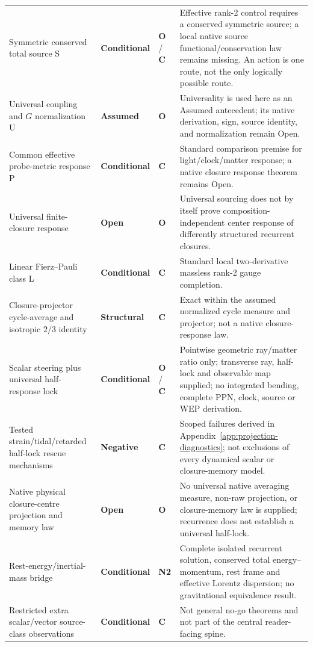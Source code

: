 \documentclass[11pt]{article}
\newcommand{\statusNegative}{\textcolor{red!65!black}{\textbf{Negative}}}
\newcommand{\statusStructural}{\textcolor{blue!55!black}{\textbf{Structural}}}
\newcommand{\statusConditional}{\textcolor{yellow!60!black}{\textbf{Conditional}}}
\newcommand{\statusAssumed}{\textcolor{orange!80!black}{\textbf{Assumed}}}
\newcommand{\statusOpen}{\textcolor{red!75!black}{\textbf{Open}}}
\newcommand{\NTwo}{\textbf{N2}}
\newcommand{\Control}{\textbf{C}}
\newcommand{\OpenBridge}{\textbf{O}}
\theoremstyle{plain}
\theoremstyle{remark}
\begin{document}
{\begin{longtable}{@{}P{3.8cm}P{2.8cm}P{1.5cm}P{5.3cm}@{}}
Symmetric conserved total source S & \statusConditional{} & \OpenBridge{} / \Control{} & Effective rank-2 control requires a conserved symmetric source; a local native source functional/conservation law remains missing. An action is one route, not the only logically possible route. \\
Universal coupling and $G$ normalization U & \statusAssumed{} & \OpenBridge{} & Universality is used here as an Assumed antecedent; its native derivation, sign, source identity, and normalization remain Open. \\
Common effective probe-metric response P & \statusConditional{} & \Control{} & Standard comparison premise for light/clock/matter response; a native closure response theorem remains Open. \\
Universal finite-closure response & \statusOpen{} & \OpenBridge{} & Universal sourcing does not by itself prove composition-independent center response of differently structured recurrent closures. \\
Linear Fierz--Pauli class L & \statusConditional{} & \Control{} & Standard local two-derivative massless rank-2 gauge completion. \\
Closure-projector cycle-average and isotropic $2/3$ identity &
\statusStructural{} & \Control{} &
Exact within the assumed normalized cycle measure and projector;
not a native closure-response law. \\
Scalar steering plus universal half-response lock &
\statusConditional{} & \OpenBridge{} / \Control{} &
Pointwise geometric ray/matter ratio only; transverse ray, half-lock and
observable map supplied; no integrated bending, complete PPN, clock,
source or WEP derivation. \\
Tested strain/tidal/retarded half-lock rescue mechanisms &
\statusNegative{} & \Control{} &
Scoped failures derived in Appendix~\ref{app:projection-diagnostics};
not exclusions of every dynamical scalar or closure-memory model. \\
Native physical closure-centre projection and memory law &
\statusOpen{} & \OpenBridge{} &
No universal native averaging measure, non-raw projection, or closure-memory
law is supplied; recurrence does not establish a universal half-lock. \\
Rest-energy/inertial-mass bridge &
\statusConditional{} & \NTwo{} &
Complete isolated recurrent solution, conserved total energy--momentum,
rest frame and effective Lorentz dispersion; no gravitational equivalence
result. \\
Restricted extra scalar/vector source-class observations & \statusConditional{} & \Control{} & Not general no-go theorems and not part of the central reader-facing spine. \\

\end{longtable}}
\end{document}
